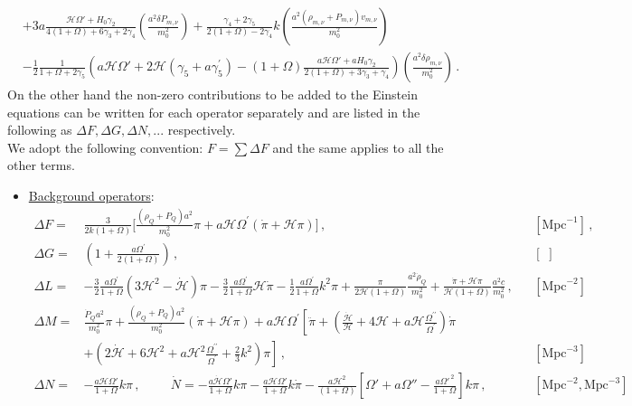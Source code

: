 \documentclass[prd,nofootinbib,showpacs]{revtex4}
\def\l{\left}
\def\r{\right}
\def\f{\frac}
\def\hub{{\mathcal H}}
\begin{document}
{\begin{align}
& +3a\f{\hub \Omega' + H_0\gamma_2}{4(1+\Omega)+6\gamma_3 +2\gamma_4}	\l(\f{a^2 \delta P_{m,\nu}}{m_0^2} \r) +\f{\gamma_4 +2\gamma_5}{2(1+\Omega) -2\gamma_4}k\l(\f{a^2\l(\rho_{m,\nu} +P_{m,\nu} \r)v_{m,\nu}}{m_0^2} \r) \nonumber \\
& -\f{1}{2}\f{1}{1+\Omega+2\gamma_5}\l( a\hub\Omega' +2\hub\l(\gamma_5+a\gamma_5^\prime\r) -(1+\Omega)\f{a\hub\Omega' +aH_0\gamma_2}{2(1+\Omega) +3\gamma_3+\gamma_4}\r)\l(\f{a^2\delta\rho_{m,\nu}}{m_0^2} \r) \, .\label{EEFT}
\end{align}
%
On the other hand the non-zero contributions to be added to the Einstein equations can be written for each operator separately and are listed in the following as $\Delta F,\Delta G, \Delta N,...$ respectively.\\
We adopt the following convention: $F=\sum \Delta F$ and the same applies to all the other terms.
%
\begin{itemize}
%
\item[] \underline{Background operators}:\\
{\small
\begin{align} \label{Eq:BackgroundOp}
\Delta F =& \frac{3}{2k(1+\Omega)}\bigg[\frac{(\rho_Q+P_Q)a^2}{m_0^2}\pi + a \mathcal{H} \Omega^\prime \left( \dot{\pi} + \mathcal{H} \pi \right) \bigg] \, , & & [\text{Mpc}^{-1}] \,, \nonumber \\
%
\Delta G =&  \left(1+ \frac{a\Omega^\prime}{2(1+\Omega)} \right)\,, \, & & [\,\,] \, \nonumber \\
%
\Delta L =& -\frac{3}{2}\frac{a\Omega^\prime}{1+\Omega}(3 \mathcal{H}^2 - \dot{\mathcal{H}})\pi -\frac{3}{2}\frac{a\Omega^\prime}{1+\Omega}\mathcal{H}\dot{\pi} -\frac{1}{2}\frac{a\Omega^\prime}{1+\Omega}k^2\pi + \frac{\pi}{2\mathcal{H}(1+\Omega)}\frac{a^2\dot{\rho}_Q}{m_0^2} + \frac{\dot{\pi}+ \mathcal{H}\pi}{\mathcal{H}(1+\Omega)}\frac{a^2c}{m_0^2}  \, , & & [\text{Mpc}^{-2}] \, \nonumber \\
%
\Delta M =& \frac{\dot{P}_Qa^2}{m_0^2}\pi + \frac{(\rho_Q + P_Q)a^2}{m_0^2}\left(\dot{\pi} + \mathcal{H} \pi \right) + a\mathcal{H}\Omega^\prime \left[ \ddot{\pi}+\left(\frac{\dot{\hub}}{\hub}+4\hub+a\hub\frac{\Omega^{\prime\prime}}{\Omega^{\prime}}\right)\dot{\pi} \right. \nonumber \\ 
&\left. + \left(2\dot{\hub}+6\hub^2+a\hub^2\frac{\Omega^{\prime\prime}}{\Omega^{\prime}}+\frac{2}{3}k^2\right) \pi\right] \, , & & [\text{Mpc}^{-3}] \, \nonumber \\
%
\Delta N =& -\f{a\hub\Omega'}{1+\Omega}k\pi \,, \hspace{1cm} \dot{N} =-\f{a\dot{\hub}\Omega'}{1+\Omega}k\pi  -\f{a\hub\Omega'}{1+\Omega}k\dot{\pi} -\f{a\hub^2}{(1+\Omega)}\l[\Omega' +a\Omega'' -\f{a\Omega'^{\,2}}{1+\Omega} \r]k\pi  \, , & & [\text{Mpc}^{-2}, \text{Mpc}^{-3}] \, \nonumber \\

\end{align}}
\end{itemize}}
\end{document}
